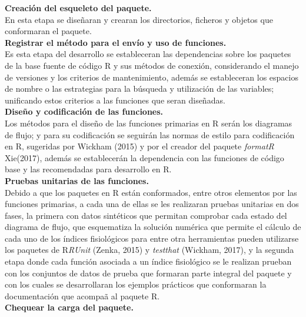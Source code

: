 \noindent
\textbf{Creación del esqueleto del paquete.}\\


En esta etapa se dise\~naran y crearan los directorios, ficheros y objetos que conformaran el paquete.\\ 

\noindent
\textbf{Registrar el m\'etodo para el env\'io y uso de funciones.}\\

Es esta etapa del desarrollo se estableceran las dependencias sobre los paquetes de la base fuente de código R y sus métodos de conexión, considerando el manejo de versiones y los criterios de mantenimiento, además  se estableceran  los espacios de nombre o las estrategias para la búsqueda y utilización de las variables; unificando estos criterios a las funciones que seran dise\~nadas.\\

\noindent
\textbf{Dise\~no y codificaci\'on de las funciones.}\\

Los m\'etodos para el dise\~no de las funciones primarias en R ser\'an los diagramas de flujo; y para su codificaci\'on se seguir\'an las normas de estilo para codificaci\'on en R, sugeridas por Wickham (2015) y por el creador del paquete \emph{formatR} Xie(2017), adem\'as se establecer\'an la dependencia con las funciones de c\'odigo base y las recomendadas para desarrollo en R.\\

\noindent
\textbf{Pruebas unitarias de las funciones.}\\

Debido a que los paquetes en R est\'an conformados, entre otros elementos por las funciones primarias, a cada una de ellas se les realizaran pruebas unitarias en dos fases, la primera con datos sint\'eticos que permitan comprobar cada estado del diagrama de flujo, que esquematiza la soluci\'on num\'erica que permite el c\'alculo de cada uno de los \'indices fisiol\'ogicos para entre otra herramientas pueden utilizarse los paquetes de R\emph{RUnit} (Zenka, 2015) y \emph{testthat} (Wickham, 2017), y la segunda etapa donde cada funci\'on asociada a un \'indice fisiol\'ogico se le realizan prueban con los conjuntos de datos de prueba que formaran parte integral del paquete y con los cuales se desarrollaran los ejemplos pr\'acticos que conformaran la documentaci\'on que acompa\~a al paquete R.\\


\newpage  
\noindent
\textbf{Chequear la carga del paquete.}\\

